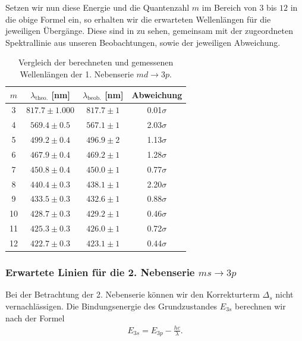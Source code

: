 Setzen wir nun diese Energie und die Quantenzahl $m$ im Bereich von $3$ bis $12$ in die obige Formel ein, so erhalten wir die erwarteten Wellenlängen für die jeweiligen Übergänge. Diese sind in  zu sehen, gemeinsam mit der zugeordneten Spektrallinie aus unseren Beobachtungen, sowie der jeweiligen Abweichung.

\begin{table}[H]
  \centering
  \caption{Vergleich der berechneten und gemessenen Wellenlängen der 1. Nebenserie $md \to 3p$.}
  \vspace*{0.5em}
  \begin{tabular}{c c c c}
      \hline
      $m$ & $\lambda_{\text{theo.}}$ [nm] & $\lambda_{\text{beob.}}$ [nm] & Abweichung \\
      \hline
      3  & $817.7 \pm 1.000$ & $817.7 \pm 1$ & 0.01$\sigma$ \\
      4  & $569.4 \pm 0.5$ & $567.1 \pm 1$ & 2.03$\sigma$ \\
      5  & $499.2 \pm 0.4$ & $496.9 \pm 2$ & 1.13$\sigma$ \\
      6  & $467.9 \pm 0.4$ & $469.2 \pm 1$ & 1.28$\sigma$ \\
      7  & $450.8 \pm 0.4$ & $450.0 \pm 1$ & 0.77$\sigma$ \\
      8  & $440.4 \pm 0.3$ & $438.1 \pm 1$ & 2.20$\sigma$ \\
      9  & $433.5 \pm 0.3$ & $432.6 \pm 1$ & 0.88$\sigma$ \\
      10 & $428.7 \pm 0.3$ & $429.2 \pm 1$ & 0.46$\sigma$ \\
      11 & $425.3 \pm 0.3$ & $426.0 \pm 1$ & 0.72$\sigma$ \\
      12 & $422.7 \pm 0.3$ & $423.1 \pm 1$ & 0.44$\sigma$ \\
      \hline
  \end{tabular}
  \label{tab:wellenlaengen_1ns}
\end{table}

\subsubsection*{Erwartete Linien für die 2. Nebenserie $ms \to 3p$}

Bei der Betrachtung der 2. Nebenserie können wir den Korrekturterm $\Delta_s$ nicht vernachlässigen. Die Bindungsenergie des Grundzustandes $E_{3s}$ berechnen wir nach der Formel
\begin{align}
  E_{3s} = E_{3p} - \frac{hc}{\lambda}.
\end{align}

